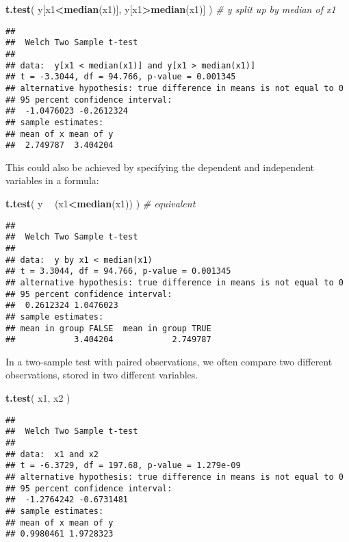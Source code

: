 \documentclass[]{book}
\newenvironment{Shaded}{\begin{snugshade}}{\end{snugshade}}
\newcommand{\CommentTok}[1]{\textcolor[rgb]{0.56,0.35,0.01}{\textit{#1}}}
\newcommand{\KeywordTok}[1]{\textcolor[rgb]{0.13,0.29,0.53}{\textbf{#1}}}
\newcommand{\NormalTok}[1]{#1}
\newcommand{\OperatorTok}[1]{\textcolor[rgb]{0.81,0.36,0.00}{\textbf{#1}}}
\newcommand{\StringTok}[1]{\textcolor[rgb]{0.31,0.60,0.02}{#1}}
\begin{document}
\begin{Shaded}
\begin{Highlighting}[]
\KeywordTok{t.test}\NormalTok{( y[x1}\OperatorTok{<}\KeywordTok{median}\NormalTok{(x1)], y[x1}\OperatorTok{>}\KeywordTok{median}\NormalTok{(x1)] ) }\CommentTok{# y split up by median of x1}
\end{Highlighting}
\end{Shaded}

\begin{verbatim}
## 
##  Welch Two Sample t-test
## 
## data:  y[x1 < median(x1)] and y[x1 > median(x1)]
## t = -3.3044, df = 94.766, p-value = 0.001345
## alternative hypothesis: true difference in means is not equal to 0
## 95 percent confidence interval:
##  -1.0476023 -0.2612324
## sample estimates:
## mean of x mean of y 
##  2.749787  3.404204
\end{verbatim}

This could also be achieved by specifying the dependent and
independent variables in a formula:\\

\begin{Shaded}
\begin{Highlighting}[]
\KeywordTok{t.test}\NormalTok{( y }\OperatorTok{~}\StringTok{ }\NormalTok{(x1}\OperatorTok{<}\KeywordTok{median}\NormalTok{(x1)) ) }\CommentTok{# equivalent}
\end{Highlighting}
\end{Shaded}

\begin{verbatim}
## 
##  Welch Two Sample t-test
## 
## data:  y by x1 < median(x1)
## t = 3.3044, df = 94.766, p-value = 0.001345
## alternative hypothesis: true difference in means is not equal to 0
## 95 percent confidence interval:
##  0.2612324 1.0476023
## sample estimates:
## mean in group FALSE  mean in group TRUE 
##            3.404204            2.749787
\end{verbatim}

In a two-sample test with paired observations, we often compare two
different observations, stored in two different variables.

\begin{Shaded}
\begin{Highlighting}[]
\KeywordTok{t.test}\NormalTok{( x1, x2 )}
\end{Highlighting}
\end{Shaded}

\begin{verbatim}
## 
##  Welch Two Sample t-test
## 
## data:  x1 and x2
## t = -6.3729, df = 197.68, p-value = 1.279e-09
## alternative hypothesis: true difference in means is not equal to 0
## 95 percent confidence interval:
##  -1.2764242 -0.6731481
## sample estimates:
## mean of x mean of y 
## 0.9980461 1.9728323
\end{verbatim}
\end{document}
